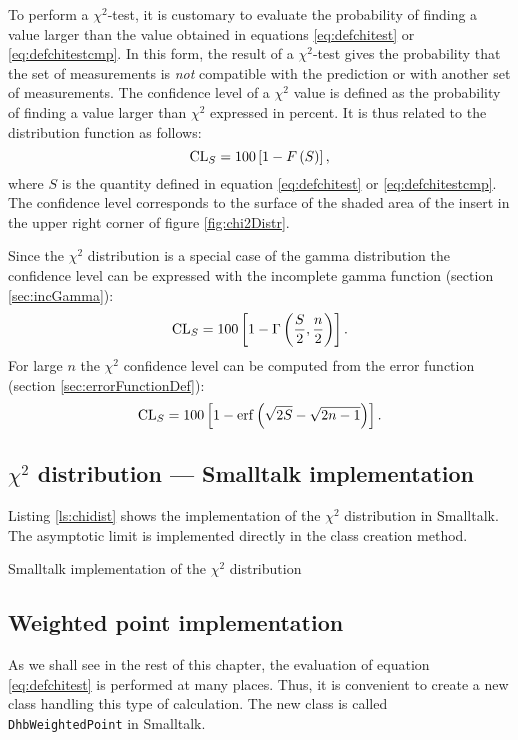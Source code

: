 \documentclass[twoside]{book}
\begin{document}
To perform a $\chi^2$-test, it is customary to evaluate the
probability of finding a value larger than the value obtained in
equations \ref{eq:defchitest} or \ref{eq:defchitestcmp}. In this
form, the result of a $\chi^2$-test gives the probability that the
set of measurements is {\sl not} compatible with the prediction or
with another set of measurements. The confidence level of a
$\chi^2$ value is defined as the probability of finding a value
larger than $\chi^2$ expressed in percent. It is thus related to
the distribution function as follows:
\begin{equation}
  {\mathop{\rm CL}}_{S}=100\left[ 1-F\left(S\right)\right],
\end{equation}
where $S$ is the quantity defined in equation \ref{eq:defchitest}
or \ref{eq:defchitestcmp}. The confidence level corresponds to the
surface of the shaded area of the insert in the upper right corner
of figure \ref{fig:chi2Distr}.

Since the $\chi^2$ distribution is a special case of the gamma
distribution the confidence level can be expressed with the
incomplete gamma function (\cf section \ref{sec:incGamma}):
\begin{equation}
\label{eq:chiTest}
  {\mathop{\rm CL}}_{S}=100\left[ 1-\Gamma\left({S \over 2},{n\over 2}\right)\right].
\end{equation}
For large $n$ the $\chi^2$ confidence level can be computed from
the error function (\cf section \ref{sec:errorFunctionDef}):
\begin{equation}
\label{eq:chiTestAsymp}
  {\mathop{\rm CL}}_{S}=100\left[ 1-\mathop{\rm erf}\left(\sqrt{2S}-\sqrt{2n-1}\right)\right].
\end{equation}

\subsection{$\chi^2$ distribution --- Smalltalk implementation}
 Listing \ref{ls:chidist} shows
the implementation of the $\chi^2$ distribution in Smalltalk. The
asymptotic limit is implemented directly in the class creation
method.
\begin{listing} Smalltalk implementation of the $\chi^2$ distribution \label{ls:chidist}

\end{listing}


\subsection{Weighted point implementation}
\label{sec:weightedPoint}  As we shall see in the rest of this chapter, the
evaluation of equation \ref{eq:defchitest} is performed at many
places. Thus, it is convenient to create a new class handling this
type of calculation. The new class is called {\tt
DhbWeightedPoint} in Smalltalk.
\end{document}
